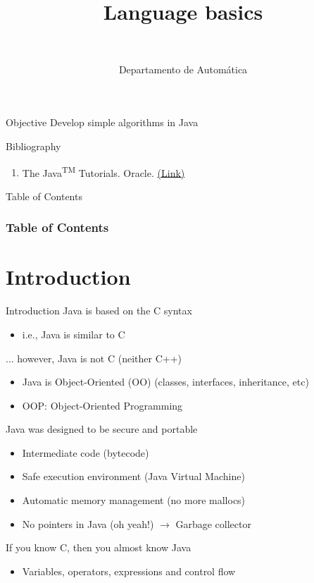 \documentclass[10pt,compress]{beamer} %
\title[Language basics]{Language basics}
\author{\asignatura\\\carrera}
\institute{}
\date{Departamento de Automática}
\begin{document}
{\titlepageBlue
    \begin{frame}
        \titlepage
    \end{frame}
}

\begin{frame}[plain]{}
   \begin{block}{Objective}
       Develop simple algorithms in Java
   \end{block}

   \begin{block}{Bibliography}
      \begin{enumerate}
          \item The Java\textsuperscript{TM} Tutorials. Oracle. \href{https://docs.oracle.com/javase/tutorial/}{(Link)}
      \end{enumerate} 
   \end{block}

\end{frame}

{
\begin{frame}[shrink]{Table of Contents}
 \frametitle{Table of Contents}
 \tableofcontents
\end{frame}
}

\section{Introduction}
\begin{frame}{Introduction}
	Java is based on the C syntax
		\begin{itemize}
		\item i.e., Java is similar to C
		\end{itemize}
	... however, Java is not C (neither C++)
		\begin{itemize}
		\item Java is Object-Oriented (OO) (classes, interfaces, inheritance, etc)
		\item OOP: Object-Oriented Programming
		\end{itemize}
	Java was designed to be secure and portable
		\begin{itemize}
		\item Intermediate code (bytecode)
		\item Safe execution environment (Java Virtual Machine)
		\item Automatic memory management (no more mallocs)
		\item No pointers in Java (oh yeah!) $\rightarrow$ \alert{Garbage collector}
		\end{itemize}
	If you know C, then you almost know Java
		\begin{itemize}
		\item Variables, operators, expressions and control flow
		\end{itemize}
\end{frame}
\end{document}
